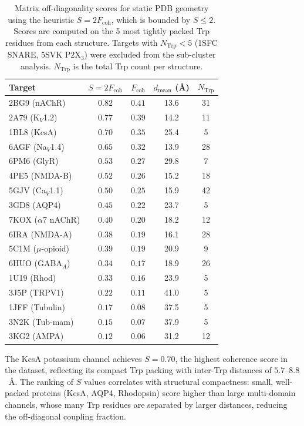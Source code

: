 \documentclass[aps,pre,twocolumn,showpacs,superscriptaddress]{revtex4-2}
\begin{document}
\begin{table}[htbp]
\caption{Matrix off-diagonality scores for static PDB geometry using the heuristic $S = 2F_{\mathrm{coh}}$, which is bounded by $S \leq 2$. Scores are computed on the 5 most tightly packed Trp residues from each structure. Targets with $N_{\mathrm{Trp}} < 5$ (1SFC SNARE, 5SVK P2X$_3$) were excluded from the sub-cluster analysis. $N_{\mathrm{Trp}}$ is the total Trp count per structure.}
\label{tab:kckas}
\centering
\begin{tabular}{lcccc}
\toprule
Target & $S = 2F_{\mathrm{coh}}$ & $F_{\mathrm{coh}}$ & $d_{\mathrm{mean}}$ (\AA) & $N_{\mathrm{Trp}}$ \\
\midrule
2BG9 (nAChR) & $\mathbf{0.82}$ & $0.41$ & 13.6 & 31 \\
2A79 (K$_V$1.2) & $0.77$ & $0.39$ & 14.2 & 11 \\
1BL8 (KcsA) & $0.70$ & $0.35$ & 25.4 & 5 \\
6AGF (Na$_V$1.4) & $0.65$ & $0.32$ & 13.9 & 28 \\
6PM6 (GlyR) & $0.53$ & $0.27$ & 29.8 & 7 \\
4PE5 (NMDA-B) & $0.52$ & $0.26$ & 15.2 & 18 \\
5GJV (Ca$_V$1.1) & $0.50$ & $0.25$ & 15.9 & 42 \\
3GD8 (AQP4) & $0.45$ & $0.22$ & 23.7 & 5 \\
7KOX ($\alpha$7 nAChR) & $0.40$ & $0.20$ & 18.2 & 12 \\
6IRA (NMDA-A) & $0.38$ & $0.19$ & 16.1 & 28 \\
5C1M ($\mu$-opioid) & $0.39$ & $0.19$ & 20.9 & 9 \\
6HUO (GABA$_A$) & $0.34$ & $0.17$ & 18.9 & 26 \\
1U19 (Rhod) & $0.33$ & $0.16$ & 23.9 & 5 \\
3J5P (TRPV1) & $0.22$ & $0.11$ & 41.0 & 5 \\
1JFF (Tubulin) & $0.17$ & $0.08$ & 37.5 & 5 \\
3N2K (Tub-mam) & $0.15$ & $0.07$ & 37.9 & 5 \\
3KG2 (AMPA) & $0.12$ & $0.06$ & 31.2 & 12 \\
\bottomrule
\end{tabular}
\end{table}

The KcsA potassium channel achieves $S = 0.70$, the highest coherence score in the dataset, reflecting its compact Trp packing with inter-Trp distances of $5.7$--$8.8$~\AA. The ranking of $S$ values correlates with structural compactness: small, well-packed proteins (KcsA, AQP4, Rhodopsin) score higher than large multi-domain channels, whose many Trp residues are separated by larger distances, reducing the off-diagonal coupling fraction.
\end{document}

